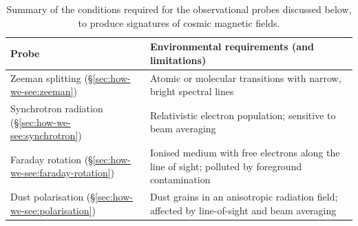 \begin{table}
\centering
\caption{Summary of the conditions required for the observational probes discussed below, to produce signatures of cosmic magnetic fields.}
\label{table:seeing:reqs}
\renewcommand{\arraystretch}{1.65}
\begin{tabular}{>{\raggedright\arraybackslash}p{} p{}}
    \hline
    Probe & Environmental requirements (and limitations) \\
    \hline
    Zeeman splitting (\S\ref{sec:how-we-see:zeeman})
    & Atomic or molecular transitions with narrow, bright spectral lines \\

    Synchrotron radiation (\S\ref{sec:how-we-see:synchrotron})
    & Relativistic electron population; sensitive to beam averaging \\

    Faraday rotation (\S\ref{sec:how-we-see:faraday-rotation})
    & Ionised medium with free electrons along the line of sight; polluted by foreground contamination \\

    Dust polarisation (\S\ref{sec:how-we-see:polarisation})
    & Dust grains in an anisotropic radiation field; affected by line-of-sight and beam averaging \\
    \hline
\end{tabular}
\end{table}

